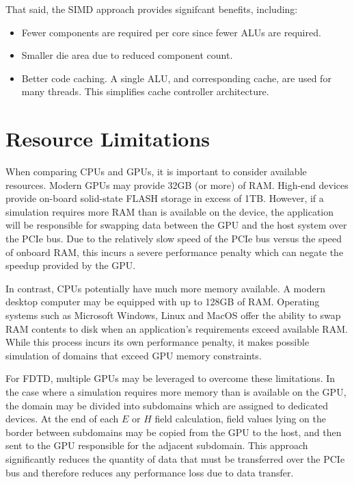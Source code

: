 That said, the SIMD approach provides signifcant benefits, including:

\begin{itemize}
	\item Fewer components are required per core since fewer ALUs are required.
	\item Smaller die area due to reduced component count.
	\item Better code caching. A single ALU, and corresponding cache, are used for many threads. This simplifies cache controller architecture.
\end{itemize}

\section{Resource Limitations}

When comparing CPUs and GPUs, it is important to consider available resources. Modern GPUs may provide 32GB (or more) of RAM.  High-end devices provide on-board solid-state FLASH storage in excess of 1TB. However, if a simulation requires more RAM than is available on the device, the application will be responsible for swapping data between the GPU and the host system over the PCIe bus. Due to the relatively slow speed of the PCIe bus versus the speed of onboard RAM, this incurs a severe performance penalty which can negate the speedup provided by the GPU. 

In contrast, CPUs potentially have much more memory available. A modern desktop computer may be equipped with up to 128GB of RAM. Operating systems such as Microsoft Windows, Linux and MacOS offer the ability to swap RAM contents to disk when an application's requirements exceed available RAM. While this process incurs its own performance penalty, it makes possible simulation of domains that exceed GPU memory constraints.

\iffalse
I'd like a wrapping up paragraph here to say that for the problem you are looking at GPU's make sense as a choice and why (likely get enough of them that cache memory isn't swapped often...) or some other tie back to the work.
\fi

For FDTD, multiple GPUs may be leveraged to overcome these limitations. In the case where a simulation requires more memory than is available on the GPU, the domain may be divided into subdomains which are assigned to dedicated devices. At the end of each $E$ or $H$ field calculation, field values lying on the border between subdomains may be copied from the GPU to the host, and then sent to the GPU responsible for the adjacent subdomain. This approach significantly reduces the quantity of data that must be transferred over the PCIe bus and therefore reduces any performance loss due to data transfer. 






